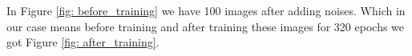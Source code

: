 \documentclass[10pt,twocolumn,letterpaper]{article}
\begin{document}

In Figure \ref{fig: before_training} we have 100 images after adding noises. Which in our case means before training and after training these images for 320 epochs we got Figure \ref{fig: after_training}.

{\small


}
\end{document}

